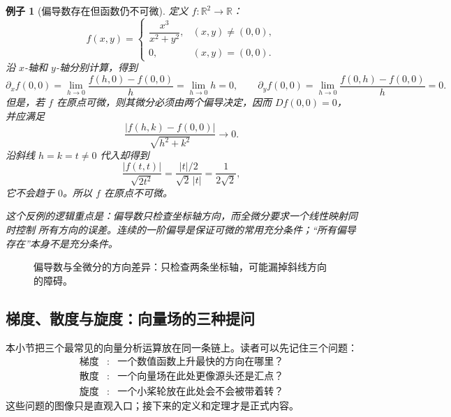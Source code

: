 \documentclass[UTF8,fontset=none,a4paper,11pt]{ctexart}
\theoremstyle{foundation-definition}
\theoremstyle{foundation-theorem}
\theoremstyle{foundation-proposition}
\theoremstyle{foundation-example}
\newtheorem{example}[definition]{例子}
\theoremstyle{foundation-remark}
\theoremstyle{foundation-theorem}
\begin{document}
\begin{example}[偏导数存在但函数仍不可微]\label{ex:partial-not-differentiable}
定义 \(f:\mathbb R^2\to\mathbb R\)：
\[
f(x,y)=
\begin{cases}
\dfrac{x^3}{x^2+y^2},&(x,y)\ne(0,0),\\[0.4em]
0,&(x,y)=(0,0).
\end{cases}
\]
沿 \(x\)-轴和 \(y\)-轴分别计算，得到
\[
\partial_xf(0,0)
=\lim_{h\to0}\frac{f(h,0)-f(0,0)}h
=\lim_{h\to0}h=0,
\qquad
\partial_yf(0,0)
=\lim_{h\to0}\frac{f(0,h)-f(0,0)}h
=0.
\]
但是，若 \(f\) 在原点可微，则其微分必须由两个偏导决定，因而 \(Df(0,0)=0\)，
并应满足
\[
\frac{|f(h,k)-f(0,0)|}{\sqrt{h^2+k^2}}\longrightarrow0.
\]
沿斜线 \(h=k=t\ne0\) 代入却得到
\[
\frac{|f(t,t)|}{\sqrt{2t^2}}
=\frac{|t|/2}{\sqrt2\,|t|}
=\frac1{2\sqrt2},
\]
它不会趋于 \(0\)。所以 \(f\) 在原点不可微。

这个反例的逻辑重点是：偏导数只检查坐标轴方向，而全微分要求一个线性映射同时控制
所有方向的误差。连续的一阶偏导是保证可微的常用充分条件；“所有偏导存在”本身不是充分条件。
\end{example}

\begin{figure}[htbp]
\centering
{}
\caption{偏导数与全微分的方向差异：只检查两条坐标轴，可能漏掉斜线方向的障碍。}
\label{fig:partial-vs-total-differential}
\end{figure}

\subsection{梯度、散度与旋度：向量场的三种提问}

本小节把三个最常见的向量分析运算放在同一条链上。读者可以先记住三个问题：
\[
\begin{array}{ccl}
\text{梯度} &:& \text{一个数值函数上升最快的方向在哪里？}\\
\text{散度} &:& \text{一个向量场在此处更像源头还是汇点？}\\
\text{旋度} &:& \text{一个小桨轮放在此处会不会被带着转？}
\end{array}
\]
这些问题的图像只是直观入口；接下来的定义和定理才是正式内容。
\end{document}
